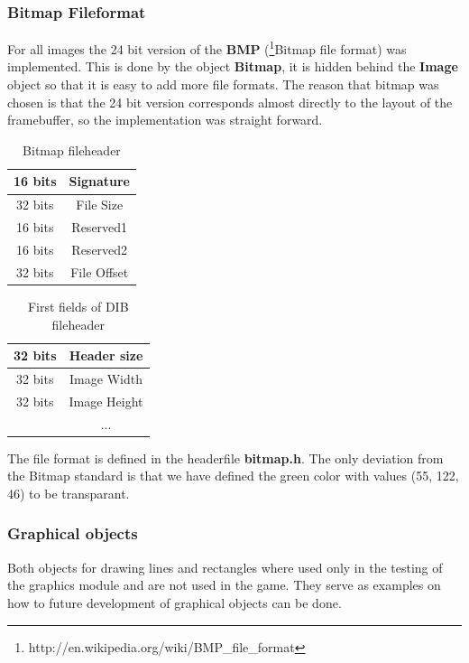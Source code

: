 \subsubsection{Bitmap Fileformat}
For all images the 24 bit version of the {\bf BMP}
(\footnote{http://en.wikipedia.org/wiki/BMP\_file\_format}{Bitmap file format}) was implemented.
This is done by the object {\bf Bitmap}, it is hidden behind the {\bf Image} object so that it is
easy to add more file formats. The reason that bitmap was chosen is that the 24 bit version
corresponds almost directly to the layout of the framebuffer, so the implementation was straight
forward.

\begin{table}[h]
  \begin{tabular}{c|c|}
    \hline
    16 bits&Signature \\
    \hline
    32 bits&File Size \\
    \hline
    16 bits&Reserved1 \\
    \hline
    16 bits&Reserved2 \\
    \hline
    32 bits&File Offset \\
    \hline
  \end{tabular}
  \caption{Bitmap fileheader}
\end{table}

\begin{table}[h]
  \begin{tabular}{c|c|}
    \hline
    32 bits&Header size \\
    \hline
    32 bits&Image Width \\
    \hline
    32 bits&Image Height \\
    \hline
    & ...  \\
  \end{tabular}
  \caption{First fields of DIB fileheader}
\end{table}

The file format is defined in the headerfile {\bf bitmap.h}. The only deviation from the Bitmap
standard is that we have defined the green color with values (55, 122, 46) to be transparant.

\subsubsection{Graphical objects}
Both objects for drawing lines and rectangles where used only in the testing of the graphics module
and are not used in the game. They serve as examples on how to future development of graphical
objects can be done.

